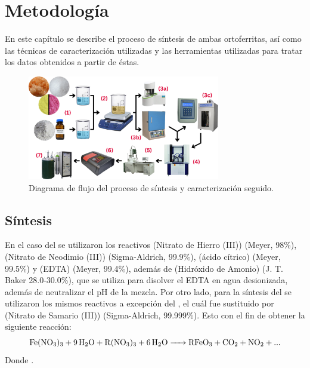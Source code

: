 \documentclass[../main.tex]{subfiles}
\begin{document}
\chapter{Metodología}
En este capítulo se describe el proceso de síntesis de ambas ortoferritas, así como las técnicas de caracterización utilizadas y las herramientas utilizadas para tratar los datos obtenidos a partir de éstas.
\begin{figure}[H]
    \centering
    \includegraphics[width=0.75\textwidth]{fig/2.png}
    \caption{Diagrama de flujo del proceso de síntesis y caracterización seguido.}
    \label{fig:diagflujosint}
\end{figure}
\section{Síntesis}
En el caso del \neod{} se utilizaron los reactivos  (Nitrato de Hierro (III)) (Meyer, 98\%),  (Nitrato de Neodimio (III)) (Sigma-Aldrich, 99.9\%),  (ácido cítrico) (Meyer, 99.5\%) y  (EDTA) (Meyer, 99.4\%), además de  (Hidróxido de Amonio) (J. T. Baker 28.0-30.0\%), que se utiliza para disolver el EDTA en agua desionizada, además de neutralizar el pH de la mezcla. Por otro lado, para la síntesis del \sama{} se utilizaron los mismos reactivos a excepción del , el cuál fue sustituido por  (Nitrato de Samario (III)) (Sigma-Aldrich, 99.999\%). Esto con el fin de obtener la siguiente reacción:
\begin{equation}
    \ce{Fe(NO3)3 + 9H2O + R(NO3)3 + 6H2O -> RFeO3 + CO2 + NO2 + ...}
    \label{eq:reaccion}
\end{equation}
Donde .
\end{document}
